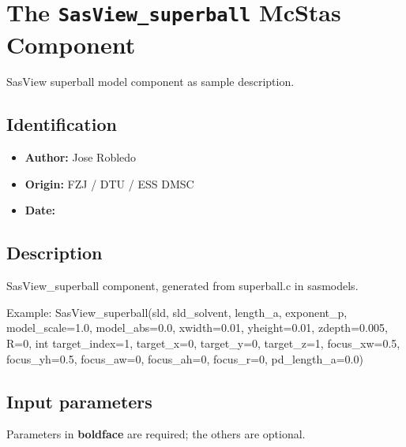 \section{The \texttt{SasView\_superball} McStas Component}
SasView superball model component as sample description.

\subsection*{Identification}
\begin{itemize}
  \item \textbf{Author:} Jose Robledo
  \item \textbf{Origin:} FZJ / DTU / ESS DMSC
  \item \textbf{Date:} 
\end{itemize}

\subsection*{Description}
SasView\_superball component, generated from superball.c in sasmodels.

Example: SasView\_superball(sld, sld\_solvent, length\_a, exponent\_p, model\_scale=1.0, model\_abs=0.0, xwidth=0.01, yheight=0.01, zdepth=0.005, R=0, int target\_index=1, target\_x=0, target\_y=0, target\_z=1, focus\_xw=0.5, focus\_yh=0.5, focus\_aw=0, focus\_ah=0, focus\_r=0, pd\_length\_a=0.0)

\subsection*{Input parameters}
Parameters in \textbf{boldface} are required; the others are optional.

